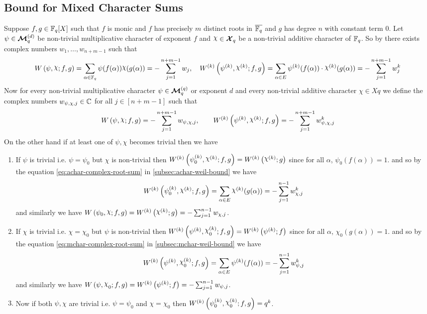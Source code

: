 \subsection{Bound for Mixed Character Sums}
Suppose $f,g\in\mathbb{F}_q[X]$ such that $f$ is monic and $f$ has precisely  $m$ distinct roots in $\overline{\mathbb{F}_q}$ and $g$ has degree $n$ with constant term $0$. Let $\psi\in\boldsymbol{\mathcal{M}}_q^{(d)}$ be non-trivial multiplicative character of exponent $f$ and $\chi\in\Xq$ be a non-trivial additive character of $\mathbb{F}_q$. So by \LiftedLRootscor there exists complex numbers $w_1,\dots, w_{n+m-1}$ such that $$\Wmix{f}{g}=\sum_{\alpha\in\bbF_q}\psi(f(\alpha))\chi(g(\alpha))=-\sum_{j=1}^{n+m-1}w_j,\quad\Wmixl{k}{f}{g}=\sum_{\alpha\in E}\psi^{(k)}(f(\alpha))\cdot \chi^{(k)}(g(\alpha))=-\sum_{j=1}^{n+m-1}w_j^k$$Now for every non-trivial multiplicative character $\psi\in\boldsymbol{\mathcal{M}}_q^{(q)}$ or exponent $d$ and every non-trivial additive character $\chi\in Xq$ we define the complex numbers $w_{\psi,\oldchi,j}\in\bbC$ for all $j\in[n+m-1]$ such that $$\Wmix{f}{g}=-\sum_{j=1}^{n+m-1}w_{\psi,\oldchi,j},\qquad \Wmixl{k}{f}{g}=-\sum_{j=1}^{n+m-1}w^k_{\psi,\oldchi,j}$$ On the other hand if at least one of $\psi,\chi$ becomes trivial then we have 
\begin{enumerate}[label=(\roman*),itemsep=-1mm]
  \item If $\psi$ is trivial i.e. $\psi=\psi_0$ but $\chi$ is non-trivial then $W^{(k)}\lt(\psi_0^{(k)},\chi^{(k)};f,g\rt)=\Wchil{k}{g}$ since for all $\alpha$, $\psi_0(f(\alpha))=1$. and so by the equation \eqref{eq:achar-complex-root-sum} in  \autoref{subsec:achar-weil-bound} we have $$W^{(k)}\lt(\psi_0^{(k)},\chi^{(k)};f,g\rt)=\sum_{\alpha\in E}\chi^{(k)}(g(\alpha))=-\sum_{j=1}^{n-1}w_{\oldchi,j}^k$$ and similarly we have $W\lt(\psi_0,\chi;f,g\rt)=\Wchil{k}{g}=-\sum_{j=1}^{n-1}w_{\oldchi,j}$.
  \item If $\chi$ is trivial i.e. $\chi=\chi_0$ but $\psi$ is non-trivial then $W^{(k)}\lt(\psi^{(k)},\chi_0^{(k)};f,g\rt)=\Wpsil{k}{f}$ since for all $\alpha$, $\chi_0(g(\alpha))=1$. and so by the equation \eqref{eq:mchar-complex-root-sum} in \autoref{subsec:mchar-weil-bound} we have $$W^{(k)}\lt(\psi^{(k)},\chi_0^{(k)};f,g\rt)=\sum_{\alpha\in E}\psi^{(k)}(f(\alpha))=-\sum_{j=1}^{n-1}w_{\psi,j}^k$$ and similarly we have $W\lt(\psi,\chi_0;f,g\rt)=\Wpsil{k}{f}=-\sum_{j=1}^{n-1}w_{\psi,j}$.
  \item Now if both $\psi,\chi$ are trivial i.e. $\psi=\psi_0$ and $\chi=\chi_0$ then $W^{(k)}\lt(\psi_0^{(k)},\chi_0^{(k)};f,g\rt)=q^k$. 
\end{enumerate}

